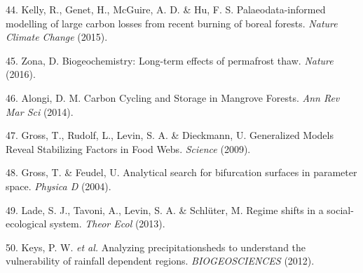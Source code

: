 \documentclass[9pt,]{article}
\begin{document}
\hypertarget{ref-Kelly:2015iq}{}
44. Kelly, R., Genet, H., McGuire, A. D. \& Hu, F. S.
Palaeodata-informed modelling of large carbon losses from recent burning
of boreal forests. \emph{Nature Climate Change} (2015).

\hypertarget{ref-Zona:2016hq}{}
45. Zona, D. Biogeochemistry: Long-term effects of permafrost thaw.
\emph{Nature} (2016).

\hypertarget{ref-Alongi:2014kq}{}
46. Alongi, D. M. Carbon Cycling and Storage in Mangrove Forests.
\emph{Ann Rev Mar Sci} (2014).

\hypertarget{ref-Gross:2009jr}{}
47. Gross, T., Rudolf, L., Levin, S. A. \& Dieckmann, U. Generalized
Models Reveal Stabilizing Factors in Food Webs. \emph{Science} (2009).

\hypertarget{ref-Gross:2004uu}{}
48. Gross, T. \& Feudel, U. Analytical search for bifurcation surfaces
in parameter space. \emph{Physica D} (2004).

\hypertarget{ref-Lade:2013iwa}{}
49. Lade, S. J., Tavoni, A., Levin, S. A. \& Schlüter, M. Regime shifts
in a social-ecological system. \emph{Theor Ecol} (2013).

\hypertarget{ref-Keys:2012bo}{}
50. Keys, P. W. \emph{et al.} Analyzing precipitationsheds to understand
the vulnerability of rainfall dependent regions. \emph{BIOGEOSCIENCES}
(2012).
\end{document}
